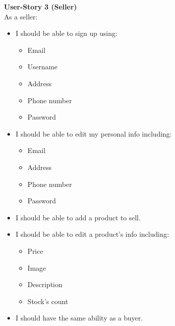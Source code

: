 \documentclass[11pt]{article}
\begin{document}
\textbf{User-Story 3 (Seller)} \\
As a seller:
\begin{itemize}
    \item I should be able to sign up using:
        \begin{itemize}
            \item Email
            \item Username
            \item Address
            \item Phone number
            \item Password
        \end{itemize}
    \item I should be able to edit my personal info including:
        \begin{itemize}
            \item Email
            \item Address
            \item Phone number
            \item Password
        \end{itemize}
    \item I should be able to add a product to sell.
    \item I should be able to edit a product's info including:
        \begin{itemize}
            \item Price
            \item Image
            \item Description
            \item Stock's count
        \end{itemize}
    \item I should have the same ability as a buyer.
\end{itemize}

\clearpage
\end{document}
